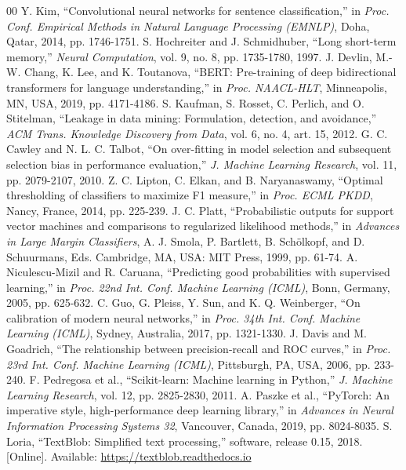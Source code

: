 \documentclass[journal,10pt]{IEEEtran}
\begin{document}
\begin{thebibliography}{00}
 Y. Kim, ``Convolutional neural networks for sentence classification,'' in \emph{Proc. Conf. Empirical Methods in Natural Language Processing (EMNLP)}, Doha, Qatar, 2014, pp. 1746-1751.
 S. Hochreiter and J. Schmidhuber, ``Long short-term memory,'' \emph{Neural Computation}, vol. 9, no. 8, pp. 1735-1780, 1997.
 J. Devlin, M.-W. Chang, K. Lee, and K. Toutanova, ``BERT: Pre-training of deep bidirectional transformers for language understanding,'' in \emph{Proc. NAACL-HLT}, Minneapolis, MN, USA, 2019, pp. 4171-4186.
 S. Kaufman, S. Rosset, C. Perlich, and O. Stitelman, ``Leakage in data mining: Formulation, detection, and avoidance,'' \emph{ACM Trans. Knowledge Discovery from Data}, vol. 6, no. 4, art. 15, 2012.
 G. C. Cawley and N. L. C. Talbot, ``On over-fitting in model selection and subsequent selection bias in performance evaluation,'' \emph{J. Machine Learning Research}, vol. 11, pp. 2079-2107, 2010.
 Z. C. Lipton, C. Elkan, and B. Naryanaswamy, ``Optimal thresholding of classifiers to maximize F1 measure,'' in \emph{Proc. ECML PKDD}, Nancy, France, 2014, pp. 225-239.
 J. C. Platt, ``Probabilistic outputs for support vector machines and comparisons to regularized likelihood methods,'' in \emph{Advances in Large Margin Classifiers}, A. J. Smola, P. Bartlett, B. Sch\"olkopf, and D. Schuurmans, Eds. Cambridge, MA, USA: MIT Press, 1999, pp. 61-74.
 A. Niculescu-Mizil and R. Caruana, ``Predicting good probabilities with supervised learning,'' in \emph{Proc. 22nd Int. Conf. Machine Learning (ICML)}, Bonn, Germany, 2005, pp. 625-632.
 C. Guo, G. Pleiss, Y. Sun, and K. Q. Weinberger, ``On calibration of modern neural networks,'' in \emph{Proc. 34th Int. Conf. Machine Learning (ICML)}, Sydney, Australia, 2017, pp. 1321-1330.
 J. Davis and M. Goadrich, ``The relationship between precision-recall and ROC curves,'' in \emph{Proc. 23rd Int. Conf. Machine Learning (ICML)}, Pittsburgh, PA, USA, 2006, pp. 233-240.
 F. Pedregosa et al., ``Scikit-learn: Machine learning in Python,'' \emph{J. Machine Learning Research}, vol. 12, pp. 2825-2830, 2011.
 A. Paszke et al., ``PyTorch: An imperative style, high-performance deep learning library,'' in \emph{Advances in Neural Information Processing Systems 32}, Vancouver, Canada, 2019, pp. 8024-8035.
 S. Loria, ``TextBlob: Simplified text processing,'' software, release 0.15, 2018. [Online]. Available: \url{https://textblob.readthedocs.io}

\end{thebibliography}
\end{document}
